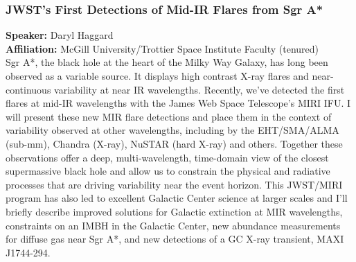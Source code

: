 \subsubsection*{JWST’s First Detections of Mid-IR Flares from Sgr A*}
\textbf{Speaker:} Daryl Haggard \\
\textbf{Affiliation:} McGill University/Trottier Space Institute \textperiodcentered{} Faculty (tenured)\\
Sgr A*, the black hole at the heart of the Milky Way Galaxy, has long been observed as a variable source. It displays high contrast X-ray flares and near-continuous variability at near IR wavelengths. Recently, we’ve detected the first flares at mid-IR wavelengths with the James Web Space Telescope’s MIRI IFU. I will present these new MIR flare detections and place them in the context of variability observed at other wavelengths, including by the EHT/SMA/ALMA (sub-mm), Chandra (X-ray), NuSTAR (hard X-ray) and others. Together these observations offer a deep, multi-wavelength, time-domain view of the closest supermassive black hole and allow us to constrain the physical and radiative processes that are driving variability near the event horizon. This JWST/MIRI program has also led to excellent Galactic Center science at larger scales and I’ll briefly describe improved solutions for Galactic extinction at MIR wavelengths, constraints on an IMBH in the Galactic Center, new abundance measurements for diffuse gas near Sgr A*, and new detections of a GC X-ray transient, MAXI J1744-294.

